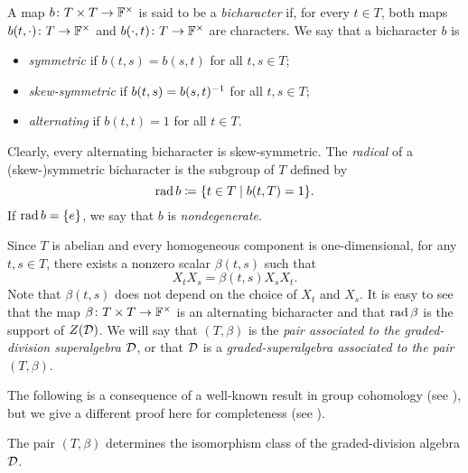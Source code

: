 \begin{defi}\label{def:bicharacter}
    A map $b\colon T\times T \to \mathbb{F}^\times$ is said to be a \emph{bicharacter} if, for every $t\in T$, both maps $b(t, \cdot)\colon T \to \mathbb{F}^\times$ and $b(\cdot, t)\colon T \to \mathbb{F}^\times$ are characters. 
    We say that a bicharacter $b$ is 
    \begin{itemize}
        \item \emph{symmetric} if $b(t,s) = b(s,t)$ for all $t,s\in T$;
        \item \emph{skew-symmetric} if $b(t,s) = b(s,t)^{-1}$ for all $t,s\in T$;
        \item \emph{alternating} if $b(t,t) = 1$ for all $t\in T$.
    \end{itemize}
    Clearly, every alternating bicharacter is skew-symmetric. 
    The \emph{radical} of a {(skew-)sym}\-metric bicharacter is the subgroup of $T$ defined by
    \[
        \operatorname{rad} b \coloneqq \{ t \in T \mid b(t, T) =1 \}.
    \]
    If $\operatorname{rad} b = \{e\}$, we say that $b$ is \emph{nondegenerate}.
\end{defi}

Since $T$ is abelian and every homogeneous component is one-dimensional, for any $t, s \in T$, there exists a nonzero scalar $\beta(t,s)$ such that 
\[\label{eq:beta}
    X_t X_s = \beta(t, s) X_s X_t.
\]
Note that $\beta(t,s)$ does not depend on the choice of $X_t$ and $X_s$. 
It is easy to see that the map $\beta\colon T\times T \to \mathbb{F}^\times$ is an alternating bicharacter and that $\operatorname{rad} \beta$ is the support of $Z(\mathcal{D})$. 
We will say that $(T, \beta)$ is the \emph{pair associated to the graded-division superalgebra $\mathcal{D}$}, or that $\mathcal{D}$ is a \emph{graded-superalgebra associated to the pair $(T,\beta)$}.

The following is a consequence of a well-known result in group cohomology (see \cite[Section 2.2]{EK_d4}), but we give a different proof here for completeness (see \cite[Section 4]{BZ18}). 

\begin{prop}\label{prop:T-beta-determines-iso}
    The pair $(T, \beta)$ determines the isomorphism class of the graded-division algebra $\mathcal{D}$.
\end{prop}

